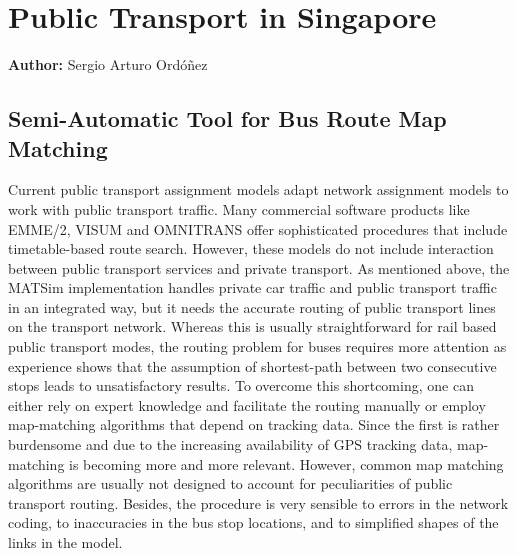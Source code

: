 




\section{Public Transport in Singapore}
\hfill \textbf{Author:} Sergio Arturo Ordóñez

\subsection{Semi-Automatic Tool for Bus Route Map Matching}
\label{sec:SemiTool}
Current public transport assignment models adapt network assignment models to work with public transport traffic. Many commercial software products like EMME/2, VISUM and OMNITRANS offer sophisticated procedures that include timetable-based route search. However, these models do not include interaction between public transport services and private transport. As mentioned above, the MATSim implementation handles private car traffic and public transport traffic in an integrated way, but it needs the accurate routing of public transport lines on the transport network. Whereas this is usually straightforward for rail based public transport modes, the routing problem for buses requires more attention as experience shows that the assumption of shortest-path between two consecutive stops leads to unsatisfactory results. To overcome this shortcoming, one can either rely on expert knowledge and facilitate the routing manually or employ map-matching algorithms that depend on tracking data. Since the first is rather burdensome and due to the increasing availability of GPS tracking data, map-matching is becoming more and more relevant. However, common map matching algorithms are usually not designed to account for peculiarities of public transport routing. Besides, the procedure is very sensible to errors in the network coding, to inaccuracies in the bus stop locations, and to simplified shapes of the links in the model.

